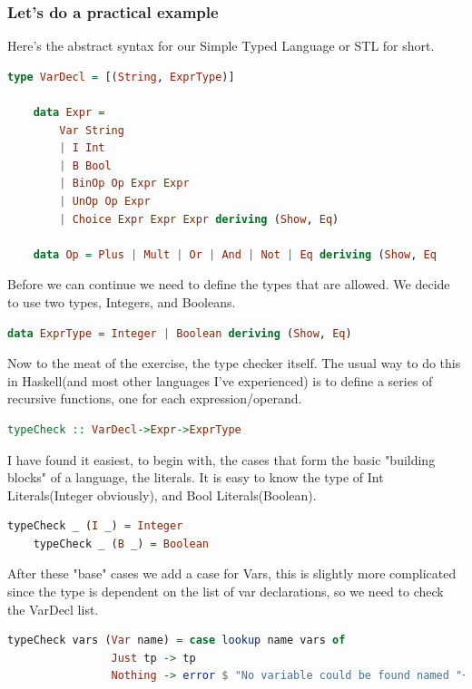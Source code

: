 \documentclass[tikz, border=5mm]{article}
\begin{document}
            \subsubsection*{Let's do a practical example}
            Here's the abstract syntax for our Simple Typed Language or STL for short.
            \begin{lstlisting}[language=Haskell]
    type VarDecl = [(String, ExprType)]

    data Expr =
        Var String
        | I Int
        | B Bool
        | BinOp Op Expr Expr
        | UnOp Op Expr
        | Choice Expr Expr Expr deriving (Show, Eq)
                
    data Op = Plus | Mult | Or | And | Not | Eq deriving (Show, Eq
            \end{lstlisting}
            Before we can continue we need to define the types that are allowed. We decide to use two types, Integers, and Booleans.
            \begin{lstlisting}[language=Haskell]
    data ExprType = Integer | Boolean deriving (Show, Eq)
            \end{lstlisting}
            Now to the meat of the exercise, the type checker itself.
            The usual way to do this in Haskell(and most other languages I've experienced) is to define a series of recursive functions, one for each
            expression/operand.
            \begin{lstlisting}[language=Haskell]
                typeCheck :: VarDecl->Expr->ExprType
            \end{lstlisting}
            I have found it easiest, to begin with, the cases that form the basic "building blocks" of a language, the literals. It is easy to know the type of Int Literals(Integer obviously), and Bool Literals(Boolean).
            \begin{lstlisting}[language=Haskell]
    typeCheck _ (I _) = Integer
    typeCheck _ (B _) = Boolean
            \end{lstlisting} 
            After these "base" cases we add a case for Vars, this is slightly more complicated since the type is dependent on the list of var declarations, 
            so we need to check the VarDecl list.
            \begin{lstlisting}[language=Haskell]
    typeCheck vars (Var name) = case lookup name vars of
                Just tp -> tp
                Nothing -> error $ "No variable could be found named "++name
            \end{lstlisting}
\end{document}
